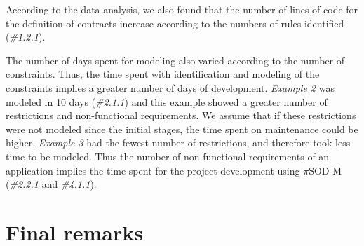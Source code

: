 \documentclass[runningheads,a4paper]{llncs}
\begin{document}
According to the data analysis, we also found that the number of lines of code
for the definition of contracts increase according to the numbers of rules
identified (\textit{\#1.2.1}). 

The number of days spent for modeling also varied
according to the number of constraints. Thus, the time spent with
identification and modeling of the constraints implies a greater number of days
of development. \textit{Example 2} was modeled in 10 days (\textit{\#2.1.1}) and
this example showed a greater number of restrictions and non-functional
requirements. We assume that if these restrictions were not modeled since the initial stages, the time spent on
maintenance could be higher. \textit{Example 3} had the fewest
number of restrictions, and therefore took less time to be modeled. Thus the
number of non-functional requirements of an application implies the time spent
for the project development using $\pi$SOD-M (\textit{\#2.2.1} and
\textit{\#4.1.1}).


\section{Final remarks}

 

\end{document}

